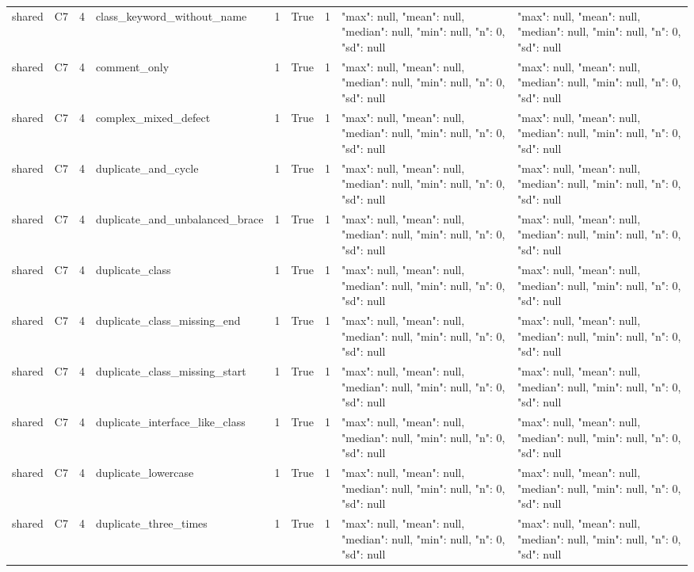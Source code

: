 \begin{tabular}{lllllllll}
shared & C7 & 4 & class\_keyword\_without\_name & 1 & True & 1 & {"max": null, "mean": null, "median": null, "min": null, "n": 0, "sd": null} & {"max": null, "mean": null, "median": null, "min": null, "n": 0, "sd": null} \\
shared & C7 & 4 & comment\_only & 1 & True & 1 & {"max": null, "mean": null, "median": null, "min": null, "n": 0, "sd": null} & {"max": null, "mean": null, "median": null, "min": null, "n": 0, "sd": null} \\
shared & C7 & 4 & complex\_mixed\_defect & 1 & True & 1 & {"max": null, "mean": null, "median": null, "min": null, "n": 0, "sd": null} & {"max": null, "mean": null, "median": null, "min": null, "n": 0, "sd": null} \\
shared & C7 & 4 & duplicate\_and\_cycle & 1 & True & 1 & {"max": null, "mean": null, "median": null, "min": null, "n": 0, "sd": null} & {"max": null, "mean": null, "median": null, "min": null, "n": 0, "sd": null} \\
shared & C7 & 4 & duplicate\_and\_unbalanced\_brace & 1 & True & 1 & {"max": null, "mean": null, "median": null, "min": null, "n": 0, "sd": null} & {"max": null, "mean": null, "median": null, "min": null, "n": 0, "sd": null} \\
shared & C7 & 4 & duplicate\_class & 1 & True & 1 & {"max": null, "mean": null, "median": null, "min": null, "n": 0, "sd": null} & {"max": null, "mean": null, "median": null, "min": null, "n": 0, "sd": null} \\
shared & C7 & 4 & duplicate\_class\_missing\_end & 1 & True & 1 & {"max": null, "mean": null, "median": null, "min": null, "n": 0, "sd": null} & {"max": null, "mean": null, "median": null, "min": null, "n": 0, "sd": null} \\
shared & C7 & 4 & duplicate\_class\_missing\_start & 1 & True & 1 & {"max": null, "mean": null, "median": null, "min": null, "n": 0, "sd": null} & {"max": null, "mean": null, "median": null, "min": null, "n": 0, "sd": null} \\
shared & C7 & 4 & duplicate\_interface\_like\_class & 1 & True & 1 & {"max": null, "mean": null, "median": null, "min": null, "n": 0, "sd": null} & {"max": null, "mean": null, "median": null, "min": null, "n": 0, "sd": null} \\
shared & C7 & 4 & duplicate\_lowercase & 1 & True & 1 & {"max": null, "mean": null, "median": null, "min": null, "n": 0, "sd": null} & {"max": null, "mean": null, "median": null, "min": null, "n": 0, "sd": null} \\
shared & C7 & 4 & duplicate\_three\_times & 1 & True & 1 & {"max": null, "mean": null, "median": null, "min": null, "n": 0, "sd": null} & {"max": null, "mean": null, "median": null, "min": null, "n": 0, "sd": null} \\

\end{tabular}
